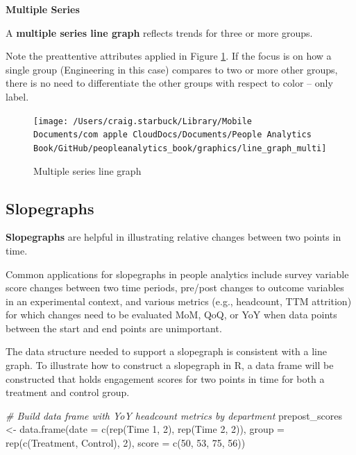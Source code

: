 \documentclass[
]{book}
\newenvironment{Shaded}{\begin{snugshade}}{\end{snugshade}}
\newcommand{\AttributeTok}[1]{\textcolor[rgb]{0.77,0.63,0.00}{#1}}
\newcommand{\CommentTok}[1]{\textcolor[rgb]{0.56,0.35,0.01}{\textit{#1}}}
\newcommand{\DecValTok}[1]{\textcolor[rgb]{0.00,0.00,0.81}{#1}}
\newcommand{\FunctionTok}[1]{\textcolor[rgb]{0.00,0.00,0.00}{#1}}
\newcommand{\NormalTok}[1]{#1}
\newcommand{\OtherTok}[1]{\textcolor[rgb]{0.56,0.35,0.01}{#1}}
\newcommand{\StringTok}[1]{\textcolor[rgb]{0.31,0.60,0.02}{#1}}
\begin{document}
\textbf{Multiple Series}

A \textbf{multiple series line graph} reflects trends for three or more groups.

Note the preattentive attributes applied in Figure \ref{fig:multi-line-graph}. If the focus is on how a single group (Engineering in this case) compares to two or more other groups, there is no need to differentiate the other groups with respect to color -- only label.

\begin{figure}

{\centering \texttt{[image: /Users/craig.starbuck/Library/Mobile Documents/com~apple~CloudDocs/Documents/People Analytics Book/GitHub/peopleanalytics\_book/graphics/line\_graph\_multi]} 

}

\caption{Multiple series line graph}\label{fig:multi-line-graph}
\end{figure}

\hypertarget{slopegraphs}{%
\subsection{Slopegraphs}\label{slopegraphs}}

\textbf{Slopegraphs} are helpful in illustrating relative changes between two points in time.

Common applications for slopegraphs in people analytics include survey variable score changes between two time periods, pre/post changes to outcome variables in an experimental context, and various metrics (e.g., headcount, TTM attrition) for which changes need to be evaluated MoM, QoQ, or YoY when data points between the start and end points are unimportant.

The data structure needed to support a slopegraph is consistent with a line graph. To illustrate how to construct a slopegraph in R, a data frame will be constructed that holds engagement scores for two points in time for both a treatment and control group.

\begin{Shaded}
\begin{Highlighting}[]
\CommentTok{\# Build data frame with YoY headcount metrics by department}
\NormalTok{prepost\_scores }\OtherTok{\textless{}{-}} \FunctionTok{data.frame}\NormalTok{(}\AttributeTok{date =} \FunctionTok{c}\NormalTok{(}\FunctionTok{rep}\NormalTok{(}\StringTok{\textquotesingle{}Time 1\textquotesingle{}}\NormalTok{, }\DecValTok{2}\NormalTok{), }\FunctionTok{rep}\NormalTok{(}\StringTok{\textquotesingle{}Time 2\textquotesingle{}}\NormalTok{, }\DecValTok{2}\NormalTok{)),}
                             \AttributeTok{group =} \FunctionTok{rep}\NormalTok{(}\FunctionTok{c}\NormalTok{(}\StringTok{\textquotesingle{}Treatment\textquotesingle{}}\NormalTok{, }\StringTok{\textquotesingle{}Control\textquotesingle{}}\NormalTok{), }\DecValTok{2}\NormalTok{),}
                             \AttributeTok{score =} \FunctionTok{c}\NormalTok{(}\DecValTok{50}\NormalTok{, }\DecValTok{53}\NormalTok{, }\DecValTok{75}\NormalTok{, }\DecValTok{56}\NormalTok{))}
\end{Highlighting}
\end{Shaded}
\end{document}
